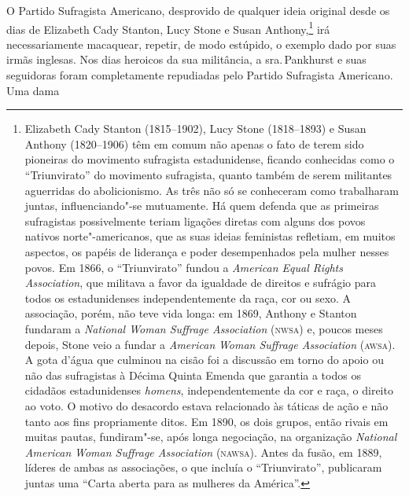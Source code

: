 O Partido Sufragista Americano, desprovido de qualquer ideia original
desde os dias de Elizabeth Cady Stanton, Lucy Stone e Susan
Anthony,\footnote{Elizabeth Cady Stanton (1815--1902), Lucy Stone
  (1818--1893) e Susan Anthony (1820--1906) têm em comum não apenas o fato
  de terem sido pioneiras do movimento sufragista estadunidense, ficando
  conhecidas como o ``Triunvirato'' do movimento sufragista, quanto
  também de serem militantes aguerridas do abolicionismo. As três não só
  se conheceram como trabalharam juntas, influenciando"-se mutuamente. Há
  quem defenda que as primeiras sufragistas possivelmente teriam ligações diretas com
  alguns dos povos nativos norte"-americanos, que as suas ideias
  feministas refletiam, em muitos aspectos, os papéis de liderança e
  poder desempenhados pela mulher nesses povos. Em 1866, o
  ``Triunvirato'' fundou a \emph{American Equal Rights Association}, que
  militava a favor da igualdade de direitos e sufrágio para todos os
  estadunidenses independentemente da raça, cor ou sexo. A associação,
  porém, não teve vida longa: em 1869, Anthony e Stanton fundaram a
  \emph{National Woman Suffrage Association} (\textsc{nwsa}) e, poucos meses
  depois, Stone veio a fundar a \emph{American} \emph{Woman Suffrage
  Association} (\textsc{awsa}). A gota d'água que culminou na cisão foi a
  discussão em torno do apoio ou não das sufragistas à Décima Quinta
  Emenda que garantia a todos os cidadãos estadunidenses \emph{homens},
  independentemente da cor e raça, o direito ao voto. O motivo do
  desacordo estava relacionado às táticas de ação e não tanto aos fins
  propriamente ditos. Em 1890, os dois grupos, então rivais em muitas
  pautas, fundiram"-se, após longa negociação, na organização
  \emph{National American} \emph{Woman Suffrage Association} (\textsc{nawsa}).
  Antes da fusão, em 1889, líderes de ambas as associações, o que
  incluía o ``Triunvirato'', publicaram juntas uma ``Carta aberta para
  as mulheres da América''.} irá necessariamente macaquear, repetir, de
modo estúpido, o exemplo dado por suas irmãs inglesas. Nos dias heroicos
da sua militância, a sra.\,Pankhurst e suas seguidoras foram
completamente repudiadas pelo Partido Sufragista Americano. Uma dama
